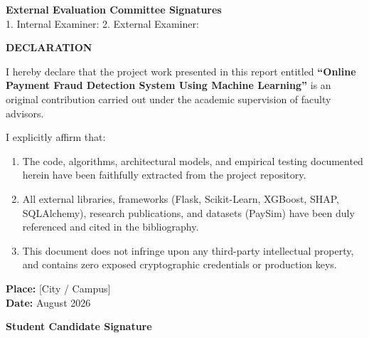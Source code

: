 \vspace{1.5cm}
\begin{center}
    \textbf{External Evaluation Committee Signatures}\\[0.5cm]
    1. Internal Examiner: \underline{\hspace{4.5cm}} \hspace{1cm} 2. External Examiner: \underline{\hspace{4.5cm}}
\end{center}

\newpage
\thispagestyle{plain}
\begin{center}
    {\LARGE \bfseries \color{primaryblue} DECLARATION}\\[1.0cm]
\end{center}

I hereby declare that the project work presented in this report entitled \textbf{``Online Payment Fraud Detection System Using Machine Learning''} is an original contribution carried out under the academic supervision of faculty advisors.

I explicitly affirm that:
\begin{enumerate}[label=\alph*.]
    \item The code, algorithms, architectural models, and empirical testing documented herein have been faithfully extracted from the project repository.
    \item All external libraries, frameworks (Flask, Scikit-Learn, XGBoost, SHAP, SQLAlchemy), research publications, and datasets (PaySim) have been duly referenced and cited in the bibliography.
    \item This document does not infringe upon any third-party intellectual property, and contains zero exposed cryptographic credentials or production keys.
\end{enumerate}

\vspace{2.5cm}
\noindent
\begin{minipage}{0.5\textwidth}
    \textbf{Place:} [City / Campus]\\
    \textbf{Date:} August 2026
\end{minipage}
\hfill
\begin{minipage}{0.4\textwidth}
    \begin{flushright}
        \textbf{Student Candidate Signature}\\[0.2cm]
        \underline{\hspace{4.5cm}}
    \end{flushright}
\end{minipage}

